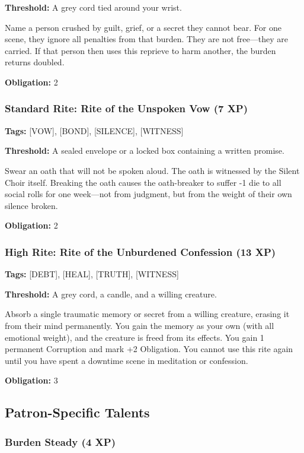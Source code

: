 \textbf{Threshold:} A grey cord tied around your wrist.

Name a person crushed by guilt, grief, or a secret they cannot bear. For one scene, they ignore all penalties from that burden. They are not free—they are carried. If that person then uses this reprieve to harm another, the burden returns doubled.

\textbf{Obligation:} 2

\subsubsection{Standard Rite: Rite of the Unspoken Vow (7 XP)}

\textbf{Tags:} [VOW], [BOND], [SILENCE], [WITNESS]

\textbf{Threshold:} A sealed envelope or a locked box containing a written promise.

Swear an oath that will not be spoken aloud. The oath is witnessed by the Silent Choir itself. Breaking the oath causes the oath-breaker to suffer -1 die to all social rolls for one week—not from judgment, but from the weight of their own silence broken.

\textbf{Obligation:} 2

\subsubsection{High Rite: Rite of the Unburdened Confession (13 XP)}

\textbf{Tags:} [DEBT], [HEAL], [TRUTH], [WITNESS]

\textbf{Threshold:} A grey cord, a candle, and a willing creature.

Absorb a single traumatic memory or secret from a willing creature, erasing it from their mind permanently. You gain the memory as your own (with all emotional weight), and the creature is freed from its effects. You gain 1 permanent Corruption and mark +2 Obligation. You cannot use this rite again until you have spent a downtime scene in meditation or confession.

\textbf{Obligation:} 3

\subsection{Patron-Specific Talents}

\subsubsection{Burden Steady (4 XP)}

